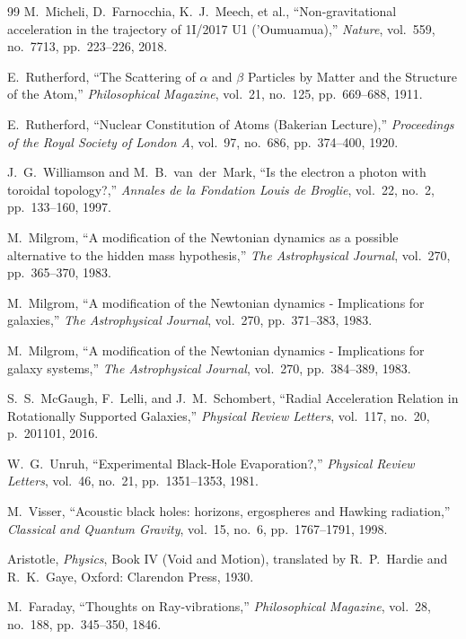 \documentclass[11pt,a4paper]{article}
\begin{document}
\begin{thebibliography}{99}
M.~Micheli, D.~Farnocchia, K.~J.~Meech, et al., ``Non-gravitational acceleration in the trajectory of 1I/2017 U1 ('Oumuamua),'' \textit{Nature}, vol.~559, no.~7713, pp.~223--226, 2018.

E.~Rutherford, ``The Scattering of $\alpha$ and $\beta$ Particles by Matter and the Structure of the Atom,'' \textit{Philosophical Magazine}, vol.~21, no.~125, pp.~669--688, 1911.

E.~Rutherford, ``Nuclear Constitution of Atoms (Bakerian Lecture),'' \textit{Proceedings of the Royal Society of London A}, vol.~97, no.~686, pp.~374--400, 1920.

J.~G.~Williamson and M.~B.~van~der~Mark, ``Is the electron a photon with toroidal topology?,'' \textit{Annales de la Fondation Louis de Broglie}, vol.~22, no.~2, pp.~133--160, 1997.

M.~Milgrom, ``A modification of the Newtonian dynamics as a possible alternative to the hidden mass hypothesis,'' \textit{The Astrophysical Journal}, vol.~270, pp.~365--370, 1983.

M.~Milgrom, ``A modification of the Newtonian dynamics - Implications for galaxies,'' \textit{The Astrophysical Journal}, vol.~270, pp.~371--383, 1983.

M.~Milgrom, ``A modification of the Newtonian dynamics - Implications for galaxy systems,'' \textit{The Astrophysical Journal}, vol.~270, pp.~384--389, 1983.

S.~S.~McGaugh, F.~Lelli, and J.~M.~Schombert, ``Radial Acceleration Relation in Rotationally Supported Galaxies,'' \textit{Physical Review Letters}, vol.~117, no.~20, p.~201101, 2016.

W.~G.~Unruh, ``Experimental Black-Hole Evaporation?,'' \textit{Physical Review Letters}, vol.~46, no.~21, pp.~1351--1353, 1981.

M.~Visser, ``Acoustic black holes: horizons, ergospheres and Hawking radiation,'' \textit{Classical and Quantum Gravity}, vol.~15, no.~6, pp.~1767--1791, 1998.

Aristotle, \textit{Physics}, Book IV (Void and Motion), translated by R.~P.~Hardie and R.~K.~Gaye, Oxford: Clarendon Press, 1930.

M.~Faraday, ``Thoughts on Ray-vibrations,'' \textit{Philosophical Magazine}, vol.~28, no.~188, pp.~345--350, 1846.


\end{thebibliography}
\end{document}
